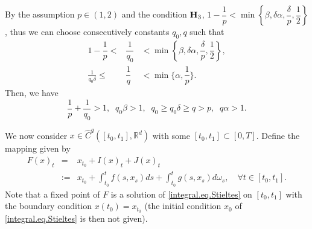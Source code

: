 \documentclass[10pt]{article}
\numberwithin{equation}{section} %
\newcommand{\R}{\ensuremath{\mathbb{R}}}
\begin{document}
By the assumption $ p\in (1,2)$ and the condition ${\textbf H}_3$,  $1-\dfrac{1}{p}<\min\left\{\beta,\delta\alpha, \dfrac{\delta}{p},\dfrac{1}{2} \right\}$, thus we can choose consecutively constants $q_0,q$ such that
\begin{eqnarray}
1-\dfrac{1}{p}< &\dfrac{1}{q_0}& <\min\left\{\beta,\delta\alpha, \dfrac{\delta}{p},\dfrac{1}{2} \right\}, \label{q0}\\
\frac{1}{q_0\delta } \leq &\dfrac{1}{q} & < \min\{\alpha, \dfrac{1}{p}\}. \label{q} 
\end{eqnarray}
Then, we have
	\begin{equation}\label{relation-p-q-alpha}
	\frac{1}{p}+\frac{1}{q_0} > 1,\;\; q_0\beta >1,\;\; q_0\geq q_0\delta \geq q> p,\;\; q\alpha > 1.
	\end{equation}

We now consider $x\in \widehat{C}^{q}([t_0,t_1],\R^d)$ with some $[t_0,t_1] \subset[0,T]$. Define the mapping given by
\begin{eqnarray}
F(x)_t &= &x_{t_0} + I(x)_t+J(x)_t\nonumber\\
&:=& x_{t_0} + \int_{t_0}^t f(s,x_s) ds +\int_{t_0}^t g(s,x_s)d\omega_s, \quad\forall t\in [t_0,t_1].\label{eqn.F}
\end{eqnarray}
Note that a fixed point of $F$ is a solution of \eqref{integral.eq.Stieltes} on $[t_0,t_1]$ with the boundary condition $x(t_0)=x_{t_0}$ (the initial condition $x_0$ of \eqref{integral.eq.Stieltes} is then not given).
\end{document}
